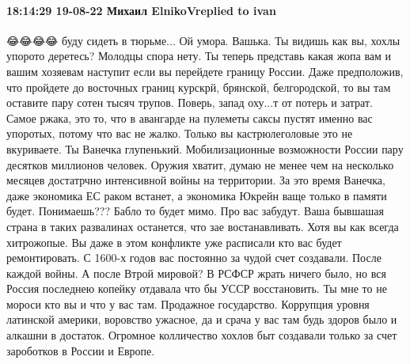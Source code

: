  
 
 
 
 

\paragraph{18:14:29 19-08-22 Михаил ElnikoVreplied to ivan}

😂😂😂😂 буду сидеть в тюрьме... Ой умора.
Вашька. Ты видишь как вы, хохлы упорото деретесь? Молодцы спора нету.
Ты теперь представь какая жопа вам и вашим хозяевам наступит если вы перейдете границу России. Даже предположив, что пройдете до восточных границ курскрй, брянской, белгородской, то вы там оставите пару сотен тысяч трупов. Поверь, запад оху...т от потерь и затрат. Самое ржака, это то, что в авангарде на пулеметы саксы пустят именно вас упоротых, потому что вас не жалко.
Только вы кастрюлеголовые это не вкуриваете.
Ты Ванечка глупенький. Мобилизационные возможности России пару десятков миллионов человек. Оружия хватит, думаю не менее чем на несколько месяцев достатрчно интенсивной войны на территории. За это время Ванечка, даже экономика ЕС раком встанет, а экономика Юкрейн ваще только в памяти будет. Понимаешь??? Бабло то будет мимо. Про вас забудут. Ваша бывшашая страна в таких развалинах останется, что зае востанавливать. Хотя вы как всегда хитрожопые. Вы даже в этом конфликте уже расписали кто вас будет ремонтировать. С 1600-х годов вас постоянно за чудой счет создавали. После каждой войны. А после Втрой мировой? В РСФСР жрать ничего было, но вся Россия последнею копейку отдавала что бы УССР восстановить.
Ты мне то не мороси кто вы и что у вас там. Продажное государство. Коррупция уровня латинской америки, воровство ужасное, да и срача у вас там будь здоров было и алкашни в достаток. Огромное колличество хохлов быт создавали только за счет зароботков в России и Европе.

